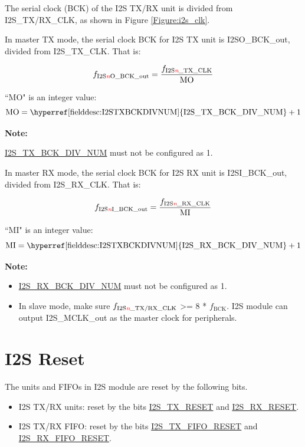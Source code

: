 \documentclass[main\_\_CN.tex]{subfiles}
\begin{document}
The serial clock (BCK) of the I2S TX/RX unit is divided from I2S\_TX/RX\_CLK, as shown in Figure \ref{Figure:i2s_clk}.

In master TX mode, the serial clock BCK for I2S TX unit is I2SO\_BCK\_out, divided from I2S\_TX\_CLK. That is:

$$f_{\textrm{I2S\textcolor{red}{\it{n}}O\_BCK\_out}} = \frac{f_{\textrm{I2S\textcolor{red}{\it{n}}\_TX\_CLK}}}{\textrm{MO}}$$


``MO" is an integer value:
$$ \textrm{MO} = \textrm{\hyperref[fielddesc:I2STXBCKDIVNUM]{I2S\_TX\_BCK\_DIV\_NUM}} + 1 $$

{\bfseries Note: }

\hyperref[fielddesc:I2STXBCKDIVNUM]{I2S\_TX\_BCK\_DIV\_NUM} must not be configured as 1.

In master RX mode, the serial clock BCK for I2S RX unit is I2SI\_BCK\_out, divided from I2S\_RX\_CLK. That is:

$$f_{\textrm{I2S\textcolor{red}{\it{n}}I\_BCK\_out}} = \frac{f_{\textrm{I2S\textcolor{red}{\it{n}}\_RX\_CLK}}}{\textrm{MI}}$$

``MI" is an integer value:
$$ \textrm{MI} = \textrm{\hyperref[fielddesc:I2STXBCKDIVNUM]{I2S\_RX\_BCK\_DIV\_NUM}} + 1 $$


{\bfseries Note: }
\begin{itemize}
    \item \hyperref[fielddesc:I2SRXBCKDIVNUM]{I2S\_RX\_BCK\_DIV\_NUM} must not be configured as 1.
    \item In slave mode, make sure $f_{\textrm{I2S\textcolor{red}{\it{n}}\_TX/RX\_CLK}}$ >= 8 * $f_{\textrm{BCK}}$. I2S module can output I2S\_MCLK\_out as the master clock for peripherals.

\end{itemize}

\section{I2S Reset} \label{i2s_module_reset}

The units and FIFOs in I2S module are reset by the following bits.
\begin{itemize}
\item I2S TX/RX units: reset by the bits  \hyperref[fielddesc:I2STXRESET]{I2S\_TX\_RESET} and  \hyperref[fielddesc:I2SRXRESET]{I2S\_RX\_RESET}.
\item I2S TX/RX FIFO: reset by the bits  \hyperref[fielddesc:I2STXFIFORESET]{I2S\_TX\_FIFO\_RESET} and  \hyperref[fielddesc:I2SRXFIFORESET]{I2S\_RX\_FIFO\_RESET}.
\end{itemize}
\end{document}
